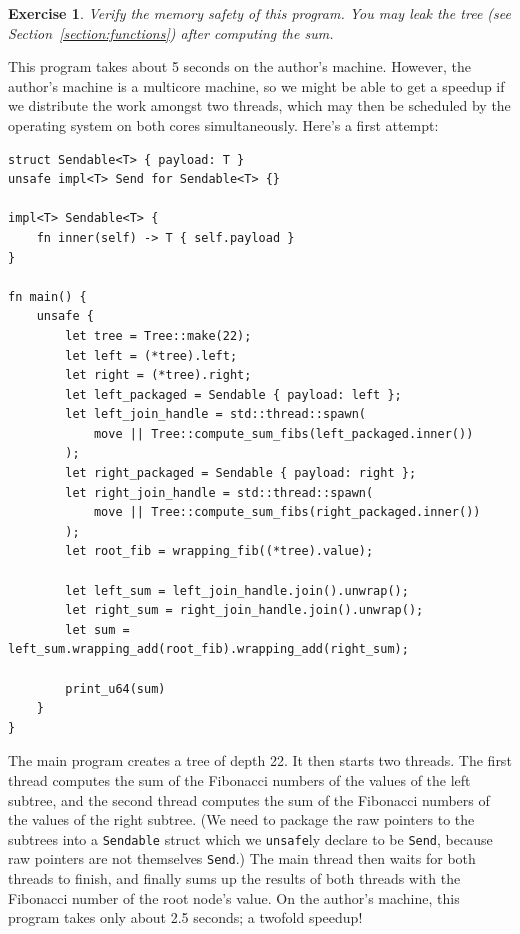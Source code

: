 \documentclass{article}
\newtheorem{exercise}{Exercise}
\begin{document}
\begin{exercise}\label{exercise:threads0}
Verify the memory safety of this program. You may leak the tree (see Section~\ref{section:functions}) after computing the sum.
\end{exercise}

This program takes about 5 seconds on the author's machine. However,
the author's machine is a multicore machine, so we might be
able to get a speedup if we distribute the work amongst two
threads, which may then be scheduled by the operating system on
both cores simultaneously. Here's a first attempt:
\begin{lstlisting}
struct Sendable<T> { payload: T }
unsafe impl<T> Send for Sendable<T> {}

impl<T> Sendable<T> {
    fn inner(self) -> T { self.payload }
}

fn main() {
    unsafe {
        let tree = Tree::make(22);
        let left = (*tree).left;
        let right = (*tree).right;
        let left_packaged = Sendable { payload: left };
        let left_join_handle = std::thread::spawn(
            move || Tree::compute_sum_fibs(left_packaged.inner())
        );
        let right_packaged = Sendable { payload: right };
        let right_join_handle = std::thread::spawn(
            move || Tree::compute_sum_fibs(right_packaged.inner())
        );
        let root_fib = wrapping_fib((*tree).value);

        let left_sum = left_join_handle.join().unwrap();
        let right_sum = right_join_handle.join().unwrap();
        let sum = left_sum.wrapping_add(root_fib).wrapping_add(right_sum);
        
        print_u64(sum)
    }
}
\end{lstlisting}
The main program creates a tree of depth 22. It then starts two
threads. The first thread computes the sum of the Fibonacci numbers of
the values of the left subtree, and the second thread computes
the sum of the Fibonacci numbers of the values of the right subtree.
(We need to package the raw pointers to the subtrees
into a \lstinline|Sendable| struct which we \lstinline|unsafe|ly declare to be \lstinline|Send|,
because raw pointers are not themselves \lstinline|Send|.)
The main thread then waits for both threads to finish, and
finally sums up the results of both threads with the Fibonacci number of
the root node's value. On the author's machine, this program
takes only about 2.5 seconds; a twofold speedup!
\end{document}
